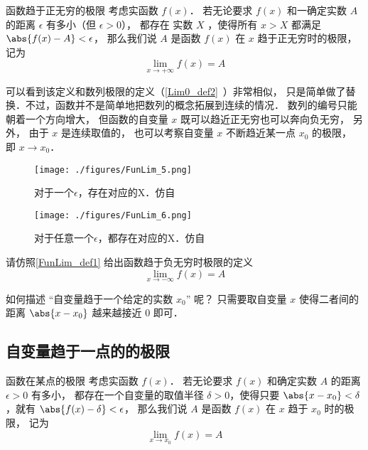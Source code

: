 \begin{definition}{函数趋于正无穷的极限}\label{FunLim_def1}
考虑实函数 $f(x)$． 若无论要求 $f(x)$ 和一确定实数 $A$ 的距离 $\epsilon$ 有多小（但 $\epsilon>0$）， 都存在 实数 $X$ ，使得所有 $x>X$ 都满足 $\abs{f(x)-A}<\epsilon$， 那么我们说 $A$ 是函数 $f(x)$ 在 $x$ 趋于正无穷时的极限， 记为
\begin{equation}
\lim\limits_{x\to +\infty} f(x) = A
\end{equation}
\end{definition}

可以看到该定义和数列极限的定义（\autoref{Lim0_def2}~）非常相似， 只是简单做了替换．不过，函数并不是简单地把数列的概念拓展到连续的情况． 数列的编号只能朝着一个方向增大， 但函数的自变量 $x$ 既可以趋近正无穷也可以奔向负无穷， 另外， 由于 $x$ 是连续取值的， 也可以考察自变量 $x$ 不断趋近某一点 $x_0$ 的极限， 即 $x\to x_0$．

\begin{figure}[ht]
\centering
\texttt{[image: ./figures/FunLim\_5.png]}
\caption{对于一个$\epsilon$，存在对应的X．仿自\cite{Thomas}} \label{FunLim_fig5}
\end{figure}

\begin{figure}[ht]
\centering
\texttt{[image: ./figures/FunLim\_6.png]}
\caption{对于任意一个$\epsilon$，都存在对应的X．仿自\cite{Thomas}} \label{FunLim_fig6}
\end{figure}

\begin{exercise}{}
请仿照\autoref{FunLim_def1} 给出函数趋于负无穷时极限的定义
\begin{equation}
\lim\limits_{x\to -\infty} f(x) = A
\end{equation}
\end{exercise}

如何描述 “自变量趋于一个给定的实数 $x_0$” 呢？ 只需要取自变量 $x$ 使得二者间的距离 $\abs{x-x_0}$ 越来越接近 $0$ 即可．

\subsection{自变量趋于一点的的极限}
\begin{definition}{函数在某点的极限}\label{FunLim_def3}
考虑实函数 $f(x)$． 若无论要求 $f(x)$ 和确定实数 $A$ 的距离 $\epsilon>0$ 有多小， 都存在一个自变量的取值半径 $\delta>0$，使得只要 $\abs{x-x_0} < \delta$，就有 $\abs{f(x)-\delta}<\epsilon$，
那么我们说 $A$ 是函数 $f(x)$ 在 $x$ 趋于 $x_0$ 时的极限， 记为
\begin{equation}
\lim\limits_{x\to x_0}f(x)=A
\end{equation}
\end{definition}

